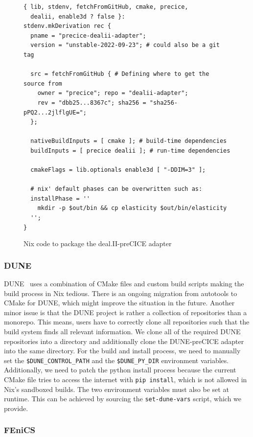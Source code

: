 \documentclass{eceasst}
\begin{document}
\begin{figure}
    \normalsize
    \begin{verbatim}
{ lib, stdenv, fetchFromGitHub, cmake, precice,
  dealii, enable3d ? false }:
stdenv.mkDerivation rec {
  pname = "precice-dealii-adapter";
  version = "unstable-2022-09-23"; # could also be a git tag

  src = fetchFromGitHub { # Defining where to get the source from
    owner = "precice"; repo = "dealii-adapter";
    rev = "dbb25...8367c"; sha256 = "sha256-pPQ2...2jlflgUE=";
  };

  nativeBuildInputs = [ cmake ]; # build-time dependencies
  buildInputs = [ precice dealii ]; # run-time dependencies

  cmakeFlags = lib.optionals enable3d [ "-DDIM=3" ];

  # nix' default phases can be overwritten such as:
  installPhase = ''
    mkdir -p $out/bin && cp elasticity $out/bin/elasticity
  '';
}
    \end{verbatim}
    \caption{Nix code to package the deal.II-preCICE adapter}
    \label{lst:dealii-adapter-nix}
\end{figure}

\subsubsection{DUNE}

DUNE~\cite{bastian2020dune} uses a combination of CMake files and custom build scripts making the build process in Nix tedious.
There is an ongoing migration from autotools to CMake for DUNE, which might improve the situation in the future.
Another minor issue is that the DUNE project is rather a collection of repositories than a monorepo. This means, users have to correctly clone all repositories such that the build system finds all relevant information.
We clone all of the required DUNE repositories into a directory and additionally clone the DUNE-preCICE adapter into the same directory.
For the build and install process, we need to manually set the \texttt{\$DUNE\_CONTROL\_PATH} and the \texttt{\$DUNE\_PY\_DIR} environment variables.
Additionally, we need to patch the python install process because the current CMake file tries to access the internet with \texttt{pip install}, which is not allowed in Nix's sandboxed builds.
The two environment variables must also be set at runtime.
This can be achieved by sourcing the \texttt{set-dune-vars} script, which we provide.

\subsubsection{FEniCS}
\end{document}

